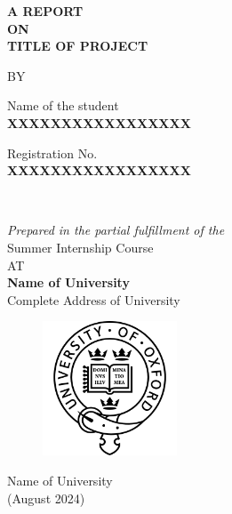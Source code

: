 \documentclass[12pt]{report}
\begin{document}
\begin{center}
{\Large \textbf{A REPORT}}\\
\bigskip
{\Large \textbf{ON}}\\
\bigskip
{\Large \textbf{TITLE OF PROJECT}}\\
\vspace{0.5cm}

\large{BY}\\

\vspace{1cm}

\begin{minipage}{.5\textwidth}
        \raggedright
    \begin{center}
        Name of the student\\
    \textbf{XXXXXXXXXXXXXXXXX}\\
    \end{center}
\end{minipage}%
\begin{minipage}{0.5\textwidth}
    \raggedleft
    \begin{center}
        Registration No.\\
    \textbf{XXXXXXXXXXXXXXXXX}\\
    \end{center}
\end{minipage}\\

\vspace{1cm}

\textit{\large{Prepared in the partial fulfillment of the}} \\
{\large{Summer Internship Course}} \\
\bigskip
\large{AT}\\
\bigskip
\textbf{Name of University} \\
\large{Complete Address of University} \\

\end{center}


\begin{center}
\begin{figure}[H]
    \centering
    \includegraphics[width=40mm]{university-of-oxford-badge-logo.png}
    \label{fig:SRMAP logo}
\end{figure}
\Large{Name of University}\\
{(August 2024)}\\
\end{center}
\end{document}
